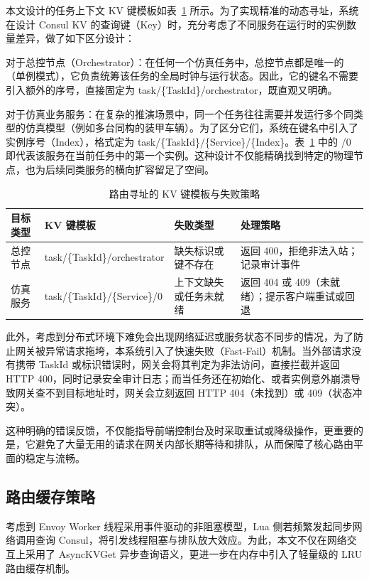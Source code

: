 \documentclass[lang=chs, degree=master, blindreview=true, winfonts=true, academic=false]{yanputhesis}
\begin{document}
本文设计的任务上下文 KV 键模板如表~\ref{tab:4_route_addressing_kv_template} 所示。为了实现精准的动态寻址，系统在设计 Consul KV 的查询键（Key）时，充分考虑了不同服务在运行时的实例数量差异，做了如下区分设计：

对于总控节点（Orchestrator）：在任何一个仿真任务中，总控节点都是唯一的（单例模式），它负责统筹该任务的全局时钟与运行状态。因此，它的键名不需要引入额外的序号，直接固定为 task/\{TaskId\}/orchestrator，既直观又明确。

对于仿真业务服务：在复杂的推演场景中，同一个任务往往需要并发运行多个同类型的仿真模型（例如多台同构的装甲车辆）。为了区分它们，系统在键名中引入了实例序号（Index），格式定为 task/\{TaskId\}/\{Service\}/\{Index\}。表~\ref{tab:4_route_addressing_kv_template} 中的 /0 即代表该服务在当前任务中的第一个实例。这种设计不仅能精确找到特定的物理节点，也为后续同类服务的横向扩容留足了空间。
\begin{table}[!h]
    \centering
    \caption{路由寻址的 KV 键模板与失败策略}
    \label{tab:4_route_addressing_kv_template}
    \begin{tabularx}{\textwidth}{>{\centering\arraybackslash}p{}
                                  >{\centering\arraybackslash}p{}
                                  >{\centering\arraybackslash}p{}
                                  >{\centering\arraybackslash}X}
        \toprule
        目标类型 & KV 键模板 & 失败类型 & 处理策略 \\ \midrule
        总控节点 & task/\{TaskId\}/orchestrator & 缺失标识或键不存在 & 返回 400，拒绝非法入站；记录审计事件 \\
        仿真服务 & task/\{TaskId\}/\{Service\}/0 & 上下文缺失或任务未就绪 & 返回 404 或 409（未就绪）；提示客户端重试或回退 \\
        \bottomrule
    \end{tabularx}
\end{table}
此外，考虑到分布式环境下难免会出现网络延迟或服务状态不同步的情况，为了防止网关被异常请求拖垮，本系统引入了快速失败（Fast-Fail）机制。当外部请求没有携带 TaskId 或标识错误时，网关会将其判定为非法访问，直接拦截并返回 HTTP 400，同时记录安全审计日志；而当任务还在初始化、或者实例意外崩溃导致网关查不到目标地址时，网关会立刻返回 HTTP 404（未找到）或 409（状态冲突）。

这种明确的错误反馈，不仅能指导前端控制台及时采取重试或降级操作，更重要的是，它避免了大量无用的请求在网关内部长期等待和排队，从而保障了核心路由平面的稳定与流畅。

\subsection{路由缓存策略}
考虑到 Envoy Worker 线程采用事件驱动的非阻塞模型，Lua 侧若频繁发起同步网络调用查询 Consul，将引发线程阻塞与排队放大效应。为此，本文不仅在网络交互上采用了 AsyncKVGet 异步查询语义，更进一步在内存中引入了轻量级的 LRU 路由缓存机制。
\end{document}
